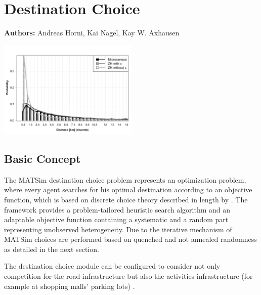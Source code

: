 \chapter{Destination Choice}
\label{ch:destinationchoice}
\hfill \textbf{Authors:} Andreas Horni, Kai Nagel, Kay W. Axhausen

\begin{center} \includegraphics[width=0.5\textwidth, angle=0]{extending/figures/dc/zhLeisure.pdf} \end{center}

\section{Basic Concept}
The MATSim destination choice problem represents an optimization problem, where every agent searches for his optimal destination according to an objective function, which is based on discrete choice theory described in length by \citet[][]{Horni_PhDThesis_2013, HorniEtAl_unpub_TRB_2012}. The framework provides a problem-tailored heuristic search algorithm and an adaptable objective function containing a systematic and a random part representing unobserved heterogeneity. Due to the iterative mechanism of MATSim choices are performed based on quenched and not annealed randomness as detailed in the next section. 

The destination choice module can be configured to consider not only competition for the road infrastructure but also the activities infrastructure (for example at shopping malls' parking lots) \citep[][]{HorniEtAl_TRR_2009}.

